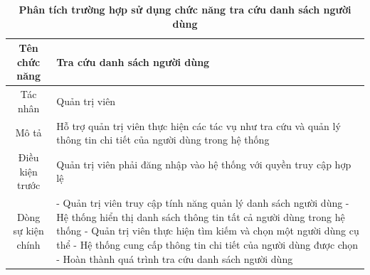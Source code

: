 \begin{table}[H]
	\caption{\bfseries \fontsize{12pt}{0pt}\selectfont Phân tích trường hợp sử dụng chức năng tra cứu danh sách người dùng}
	\centering
	\begin{tabularx}{0.9\textwidth}{|c|X|}
		\hline
		\textbf{Tên chức năng} & \textbf{Tra cứu danh sách người dùng}                                                                             \\
		\hline
		Tác nhân               & Quản trị viên                                                                                                     \\
		\hline
		Mô tả                  & Hỗ trợ quản trị viên thực hiện các tác vụ như tra cứu và quản lý thông tin chi tiết của người dùng trong hệ thống \\
		\hline
		Điều kiện trước        & Quản trị viên phải đăng nhập vào hệ thống với quyền truy cập hợp lệ                                               \\
		\hline
		Dòng sự kiện chính     &
		- Quản trị viên truy cập tính năng quản lý danh sách người dùng \newline
		- Hệ thống hiển thị danh sách thông tin tất cả người dùng trong hệ thống \newline
		- Quản trị viên thực hiện tìm kiếm và chọn một người dùng cụ thể \newline
		- Hệ thống cung cấp thông tin chi tiết của người dùng được chọn \newline
		- Hoàn thành quá trình tra cứu danh sách người dùng                                                                                        \\
		\hline
	\end{tabularx}
\end{table}

